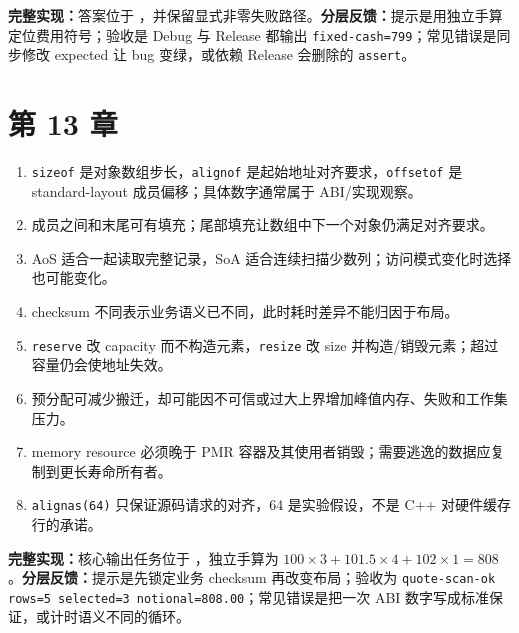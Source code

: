 \noindent\textbf{完整实现：}答案位于 ，并保留显式非零失败路径。\textbf{分层反馈：}提示是用独立手算定位费用符号；验收是 Debug 与 Release 都输出 \texttt{fixed-cash=799}；常见错误是同步修改 expected 让 bug 变绿，或依赖 Release 会删除的 \texttt{assert}。

\section{第 13 章}
\begin{enumerate}
  \item \texttt{sizeof} 是对象数组步长，\texttt{alignof} 是起始地址对齐要求，\texttt{offsetof} 是 standard-layout 成员偏移；具体数字通常属于 ABI/实现观察。
  \item 成员之间和末尾可有填充；尾部填充让数组中下一个对象仍满足对齐要求。
  \item AoS 适合一起读取完整记录，SoA 适合连续扫描少数列；访问模式变化时选择也可能变化。
  \item checksum 不同表示业务语义已不同，此时耗时差异不能归因于布局。
  \item \texttt{reserve} 改 capacity 而不构造元素，\texttt{resize} 改 size 并构造/销毁元素；超过容量仍会使地址失效。
  \item 预分配可减少搬迁，却可能因不可信或过大上界增加峰值内存、失败和工作集压力。
  \item memory resource 必须晚于 PMR 容器及其使用者销毁；需要逃逸的数据应复制到更长寿命所有者。
  \item \texttt{alignas(64)} 只保证源码请求的对齐，64 是实验假设，不是 C++ 对硬件缓存行的承诺。
\end{enumerate}

\noindent\textbf{完整实现：}核心输出任务位于 ，独立手算为 \(100\times3+101.5\times4+102\times1=808\)。\textbf{分层反馈：}提示是先锁定业务 checksum 再改变布局；验收为 \texttt{quote-scan-ok rows=5 selected=3 notional=808.00}；常见错误是把一次 ABI 数字写成标准保证，或计时语义不同的循环。

